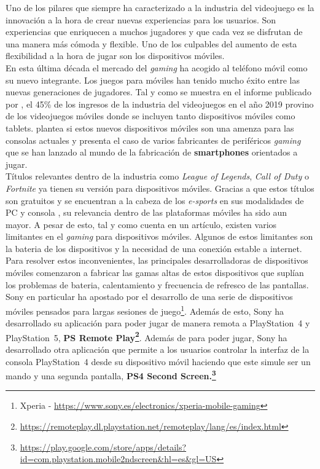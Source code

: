 Uno de los pilares que siempre ha caracterizado a la industria del videojuego es la innovaci\'on a la hora de crear nuevas experiencias para los usuarios. Son experiencias que enriquecen a muchos jugadores y que cada vez se disfrutan de una manera m\'as c\'omoda y flexible. Uno de los culpables del aumento de esta flexibilidad a la hora de jugar son los dispositivos m\'oviles. \\

En esta \'ultima d\'ecada el mercado del \textit{gaming} ha acogido al tel\'efono m\'ovil como su nuevo integrante. Los juegos para m\'oviles han tenido mucho \'exito entre las nuevas generaciones de jugadores. Tal y como se muestra en el informe publicado por \cite{AEVI2019}, el 45\% de los ingresos de la industria del videojuegos en el a\~no 2019 provino de los videojuegos m\'oviles donde se incluyen tanto dispositivos m\'oviles como tablets. \cite{moviles} plantea si estos nuevos dispositivos m\'oviles son una amenza para las consolas actuales y presenta el caso de varios fabricantes de perif\'ericos \textit{gaming} que se han lanzado al mundo de la fabricaci\'on de \textbf{smartphones} orientados a jugar. \\

T\'itulos relevantes dentro de la industria como \textit{League of Legends}, \textit{Call of Duty} o \textit{Fortnite} ya tienen su versi\'on para dispositivos m\'oviles. Gracias a que estos t\'itulos son gratuitos y se encuentran a la cabeza de los \textit{e-sports} en sus modalidades de PC y consola \citep*{TEOQ32020}, su relevancia dentro de las plataformas m\'oviles ha sido aun mayor. A pesar de esto, tal y como cuenta \cite{futuro} en un art\'iculo, existen varios limitantes en el \textit{gaming} para dispositivos m\'oviles. Algunos de estos limitantes son la bateria de los dispositivos y la necesidad de una conexi\'on estable a internet.\\

Para resolver estos inconvenientes, las principales desarrolladoras de dispositivos m\'oviles comenzaron a fabricar las gamas altas de estos dispositivos que supl\'ian los problemas de bateria, calentamiento y frecuencia de refresco de las pantallas. Sony en particular ha apostado por el desarrollo de una serie de dispositivos m\'oviles pensados para largas sesiones de juego\footnote{Xperia -  \url{https://www.sony.es/electronics/xperia-mobile-gaming}}. Adem\'as de esto, Sony ha desarrollado su aplicaci\'on para poder jugar de manera remota a PlayStation~4 y PlayStation~5, \textbf{PS Remote Play\footnote{\url{https://remoteplay.dl.playstation.net/remoteplay/lang/es/index.html}}}. Adem\'as de para poder jugar, Sony ha desarrollado otra aplicaci\'on que permite a los usuarios controlar la interfaz de la consola PlayStation~4 desde su dispositivo m\'ovil haciendo que este simule ser un mando y una segunda pantalla, \textbf{PS4 Second Screen.\footnote{\url{https://play.google.com/store/apps/details?id=com.playstation.mobile2ndscreen&hl=es&gl=US}}}\\

